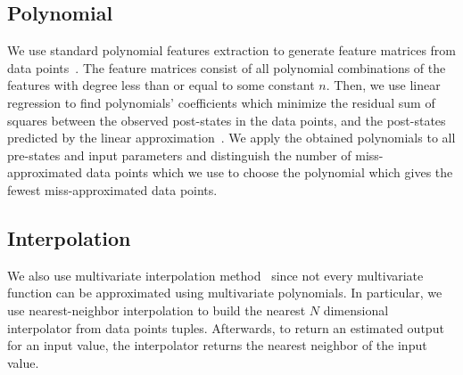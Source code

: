 
\subsection{Polynomial} 
We use standard polynomial features extraction to generate feature matrices from data points~\cite{statics1}. 
The feature matrices consist of all polynomial combinations of the features with degree less than or equal to some constant $n$. Then, we use linear regression to find polynomials' coefficients which minimize the residual sum of squares between the observed post-states in the data points, and the post-states predicted by the linear approximation~\cite{statics2}. We apply the obtained polynomials to all pre-states and input parameters and distinguish the number of miss-approximated data points which we use to choose the polynomial which gives the fewest miss-approximated data points. %

\subsection{Interpolation} 
We also use multivariate interpolation method~\cite{interpolation} since not every multivariate function can be approximated using multivariate polynomials. In particular, we use nearest-neighbor interpolation to build the nearest $N$ dimensional interpolator from data points tuples. Afterwards, to return an estimated output for an input value, the interpolator returns the nearest neighbor of the input value. 


